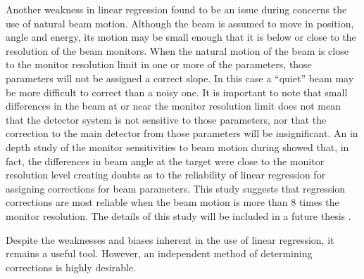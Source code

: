 Another weakness in linear regression found to be an issue during \Qs concerns the use of natural beam motion. Although the beam is assumed to move in position, angle and energy, its motion may be small enough that it is below or close to the resolution of the beam monitors. When the natural motion of the beam is close to the monitor resolution limit in one or more of the parameters, those parameters will not be assigned a correct slope. In this case a ``quiet'' beam may be more difficult to correct than a noisy one. It is important to note that small differences in the beam at or near the monitor resolution limit does not mean that the detector system is not sensitive to those parameters, nor that the correction to the main detector from those parameters will be insignificant. An in depth study of the monitor sensitivities to beam motion during \Qs showed that, in fact, the differences in beam angle at the target were close to the monitor resolution level creating doubts as to the reliability of linear regression for assigning corrections for beam parameters. This study suggests that regression corrections are most reliable when the beam motion is more than 8 times the monitor resolution. The details of this study will be included in a future thesis \cite{Peng}.

Despite the weaknesses and biases inherent in the use of linear regression, it remains a useful tool. However, an independent method of determining corrections is highly desirable.



